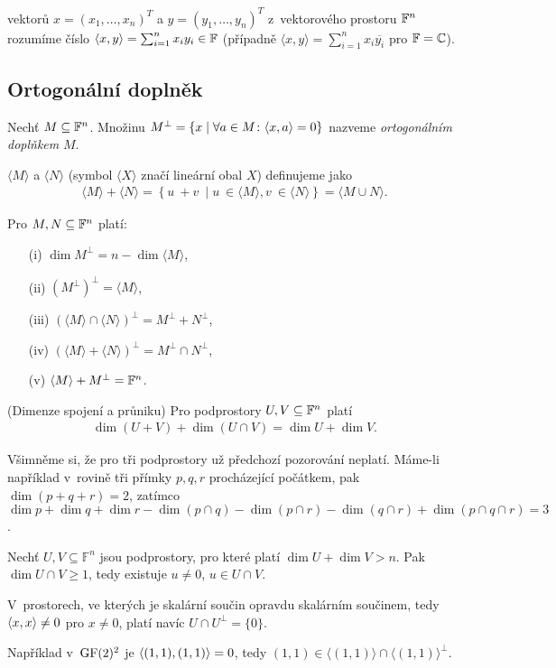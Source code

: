  vektorů $x=(x_1,\dots,x_n)^T$ a $y=(y_1,\dots,y_n)^T$ z~vektorového prostoru $\mathbb{F}^n$ rozumíme číslo $\langle x,y\rangle=\sum_{i=1}^nx_iy_i\in\mathbb{F}$ (případně $\langle x,y\rangle=\sum_{i=1}^nx_i\overline{y_i}$ pro $\mathbb{F}=\mathbb{C}$).

\medskip
\subsection{Ortogonální doplněk}


\df Nechť $M \subseteq \mathbb{F}^n$. Množinu $M^\bot = \{x \mid \forall a\in M\colon {\langle x,a\rangle} = 0\}$ nazveme {\it ortogonálním doplňkem} $M$.

 $\langle M\rangle$ a $\langle N\rangle$ (symbol $\langle X\rangle$ značí lineární obal $X$) definujeme jako
\begin{align}
\langle M\rangle + \langle N\rangle = \left\{ u~+ v~\mid u~\in \langle M\rangle, v~\in \langle N \rangle\right\} = \langle M\cup N\rangle.
\end{align}

\poz Pro $M,N\subseteq\mathbb{F}^n$ platí:
\begin{enumerate}\itemsep1pt \parskip0pt 
	\item[(i)] $\dim M^\bot = n - \dim \langle M\rangle$,
	\item[(ii)] ${(M^\bot)}^\bot = \langle M\rangle$,
	\item[(iii)] $(\langle M\rangle \cap \langle N\rangle)^\bot = M^\bot + N^\bot$,
	\item[(iv)] $(\langle M\rangle+\langle N\rangle)^\bot = M^\bot \cap N^\bot$,
	\item[(v)] $\langle M\rangle + M^\bot =\mathbb{F}^n$.
\end{enumerate}

\vt (Dimenze spojení a průniku) Pro podprostory $U,V\subseteq\mathbb{F}^n$ platí \begin{align}
\dim(U + V) + \dim(U \cap V) = \dim U+ \dim V.
\end{align}

Všimněme si, že pro tři podprostory už předchozí pozorování neplatí. Máme-li například v~rovině tři přímky $p,q,r$ procházející počátkem, pak $\dim(p + q + r) =2$, zatímco $\dim p + \dim q + \dim r - \dim(p \cap q) - \dim(p \cap r) - \dim(q \cap r) + \dim(p \cap q \cap r)=3$.

\dsl Nechť $U,V \subseteq \mathbb{F}^n$ jsou podprostory, pro které platí $\dim U + \dim V > n$. Pak $\dim U \cap V \ge 1$, tedy existuje $u \neq 0$, $u \in U\cap V$.

\dsl V~prostorech, ve kterých je skalární součin opravdu skalárním součinem, tedy ${\langle x,x\rangle} \neq 0$ pro $x\neq 0$, platí navíc $U\cap U^\bot = \{0\}$.

\medskip
Například v~$\mathrm{GF}(2)^2$ je ${\langle (1,1), (1,1)\rangle} = 0$, tedy $(1,1)\in\langle(1,1)\rangle\cap\langle(1,1)\rangle^\bot$.
